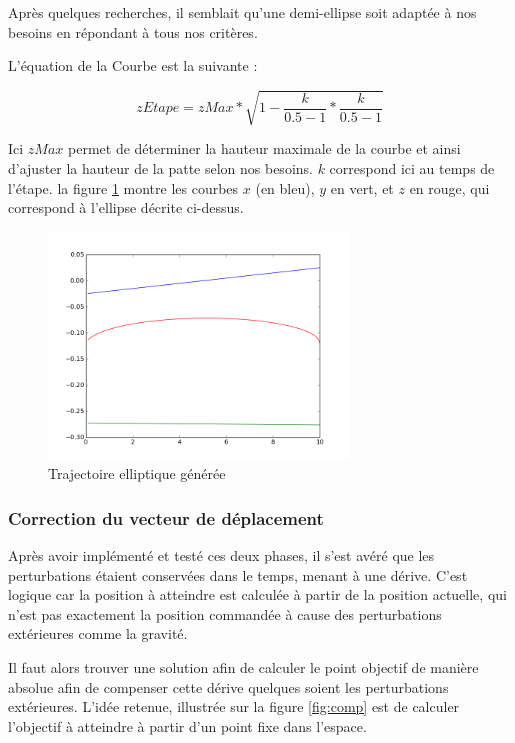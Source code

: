\documentclass{tnreport}
\begin{document}
Après quelques recherches, il semblait qu'une demi-ellipse soit adaptée à nos besoins en répondant à tous nos critères. 

L'équation de la Courbe est la suivante :

\begin{equation}
   zEtape = zMax * \sqrt{1 - \frac{k}{0.5 - 1} * \frac{k}{ 0.5 - 1}}
\end{equation}

Ici $zMax$ permet de déterminer la hauteur maximale de la courbe et ainsi d'ajuster la hauteur de la patte selon nos besoins. $k$ correspond ici au temps de l'étape. la figure \ref{fig:trajplot} montre les courbes $x$ (en bleu), $y$ en vert, et $z$ en rouge, qui correspond à l'ellipse décrite ci-dessus. 
\begin{figure}[h]
    \centering
    \includegraphics[width=8cm]{figures/beforeIK}
    \caption{Trajectoire elliptique générée}
    \label{fig:trajplot}
\end{figure}

\subsubsection{Correction du vecteur de déplacement}\label{lb:corrvect}
Après avoir implémenté et testé ces deux phases, il s'est avéré que les perturbations étaient conservées dans le temps, menant à une dérive. C'est logique car la position à atteindre est calculée à partir de la position actuelle, qui n'est pas exactement la position commandée à cause des perturbations extérieures comme la gravité.

Il faut alors trouver une solution afin de calculer le point objectif de manière absolue afin de compenser cette dérive quelques soient les perturbations extérieures. L'idée retenue, illustrée sur la figure \ref{fig:comp} est de calculer l'objectif à atteindre à partir d'un point fixe dans l'espace. 
\end{document}
